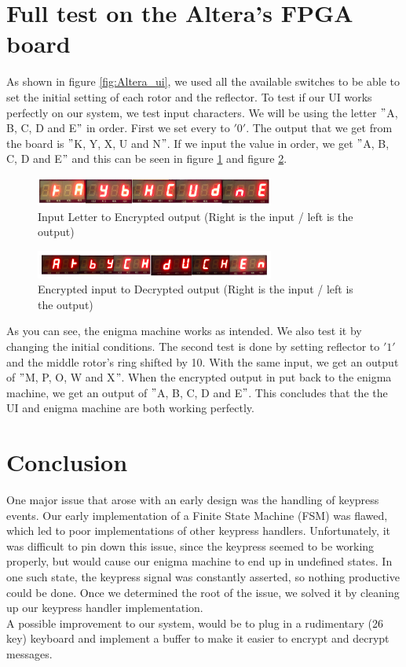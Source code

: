 \documentclass[10pt]{article}
\begin{document}
\section{Full test on the Altera's FPGA board}
As shown in figure \ref{fig:Altera_ui}, we used all the available switches to be able to set the initial setting of each rotor and the reflector. To test if our UI works perfectly on our system, we test input characters. We will be using the letter $"$A, B, C, D and E$"$ in order. First we set every to $'0'$. The output that we get from the board is $"$K, Y, X, U and N$"$. If we input the value in order, we get $"$A, B, C, D and E$"$ and this can be seen in figure \ref{fig:letter_encrypt} and figure \ref{fig:encrypt_letter}.\\
\begin{figure}[!htb]
    \centering
    \includegraphics[width=0.7\textwidth]{./letter_encrypt.png}
    \caption{Input Letter to Encrypted output (Right is the input / left is the output)}
    \label{fig:letter_encrypt}
\end{figure}
\begin{figure}[!htb]
    \centering
    \includegraphics[width=0.7\textwidth]{./encrypt_letter.png}
    \caption{Encrypted input to Decrypted output (Right is the input / left is the output)}
    \label{fig:encrypt_letter}
\end{figure}
\newline

As you can see, the enigma machine works as intended. We also test it by changing the initial conditions. The second test is done by setting reflector to $'1'$ and the middle rotor's ring shifted by 10. With the same input, we get an output of $"$M, P, O, W and X$"$. When the encrypted output in put back to the enigma machine, we get an output of $"$A, B, C, D and E$"$. This concludes that the the UI and enigma machine are both working perfectly.

\section{Conclusion}
One major issue that arose with an early design was the handling of keypress events. Our early implementation of a Finite State Machine (FSM) was flawed, which led to poor implementations of other keypress handlers. Unfortunately, it was difficult to pin down this issue, since the keypress seemed to be working properly, but would cause our enigma machine to end up in undefined states. In one such state, the keypress signal was constantly asserted, so nothing productive could be done. Once we determined the root of the issue, we solved it by cleaning up our keypress handler implementation.\\

A possible improvement to our system, would be to plug in a rudimentary (26 key) keyboard and implement a buffer to make it easier to encrypt and decrypt messages.
\end{document}
